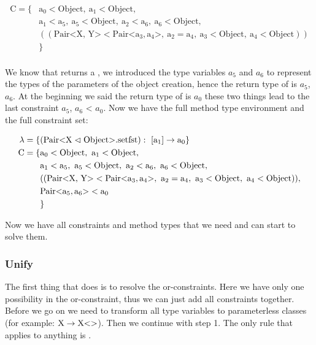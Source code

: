 \begin{align*}
    \text{C} = \{& \text{a}_0 < \text{Object}, \ \text{a}_1 < \text{Object}, \\
    &\text{a}_1 < \text{a}_5, \ \text{a}_5 < \text{Object}, \ \text{a}_2 < \text{a}_6, \ \text{a}_6 < \text{Object}, \\
    &(( \text{Pair<X, Y>} < \text{Pair<} \text{a}_3, \text{a}_4 \text{>}, \ \text{a}_2 = \text{a}_4, \ \text{a}_3 < \text{Object}, \ \text{a}_4 < \text{Object} ))\\
    &\}\\
\end{align*}

We know that  returns a , we introduced the type variables $a_5$ and $a_6$ to represent the types of the parameters of the object creation, hence the return type of  is $a_5$, $a_6$\inl{>}.
At the beginning we said the return type of  is $a_0$ these two things lead to the last constraint $a_5$, $a_6$\inl{>} < $a_0$.
Now we have the full method type environment and the full constraint set:

\begin{align*}
    \lambda = \{& ( \cxnm{Pair}{X}{Object}{setfst} ): \ [\text{a}_1] \to \text{a}_0 \}\\
    \text{C} = \{& \text{a}_0 < \text{Object}, \ \text{a}_1 < \text{Object}, \\
    &\text{a}_1 < \text{a}_5, \ \text{a}_5 < \text{Object}, \ \text{a}_2 < \text{a}_6, \ \text{a}_6 < \text{Object}, \\
    &(( \text{Pair<X, Y>} < \text{Pair<} \text{a}_3, \text{a}_4 \text{>}, \ \text{a}_2 = \text{a}_4, \ \text{a}_3 < \text{Object}, \ \text{a}_4 < \text{Object} )),\\
    &\text{Pair<}\text{a}_5, \text{a}_6\text{>} < \text{a}_0\\
    &\}\\
\end{align*}

Now we have all constraints and method types that we need and can start to solve them.

\subsubsection{Unify}
The first thing that  does is to resolve the or-constraints. Here we have only one possibility in the or-constraint, thus we can just add all constraints together.
Before we go on we need to transform all type variables to parameterless classes (for example: $\text{X} \to \text{X} \text{<}  \text{>}$).
Then we continue with step 1. The only rule that applies to anything is .

